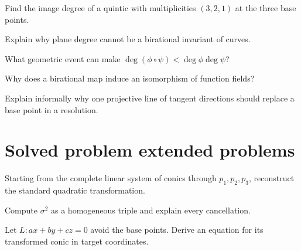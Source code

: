 \begin{exercise}\label{exr:vi44-20}
Find the image degree of a quintic with multiplicities \((3,2,1)\) at the three base points.
\end{exercise}

\begin{exercise}\label{exr:vi44-21}
Explain why plane degree cannot be a birational invariant of curves.
\end{exercise}

\begin{exercise}\label{exr:vi44-22}
What geometric event can make \(\deg(\phi\circ\psi)<\deg\phi\deg\psi\)?
\end{exercise}

\begin{exercise}\label{exr:vi44-23}
Why does a birational map induce an isomorphism of function fields?
\end{exercise}

\begin{exercise}\label{exr:vi44-24}
Explain informally why one projective line of tangent directions should replace a base point in a resolution.
\end{exercise}

\ifdefined\IncludeExerciseHints

\fi
\ifdefined\IncludeExerciseSolutions

\fi

\section{Solved problem extended problems}

\begin{problem}\label{prob:vi44-01}
Starting from the complete linear system of conics through \(p_1,p_2,p_3\), reconstruct the standard quadratic transformation.
\end{problem}

\begin{problem}\label{prob:vi44-02}
Compute \(\sigma^2\) as a homogeneous triple and explain every cancellation.
\end{problem}

\begin{problem}\label{prob:vi44-03}
Let \(L:a x+b y+c z=0\) avoid the base points.  Derive an equation for its transformed conic in target coordinates.
\end{problem}


